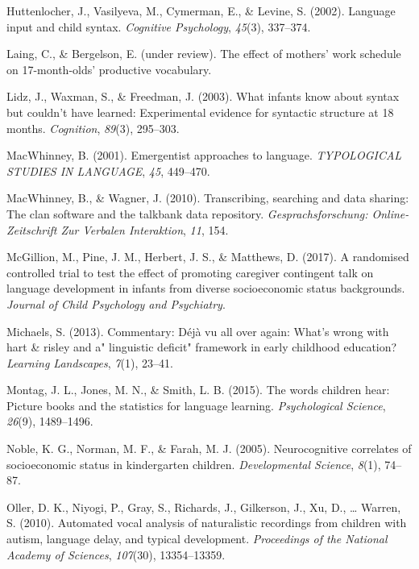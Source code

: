 \documentclass[floatsintext,man]{apa6}
\theoremstyle{definition}
\theoremstyle{definition}
\theoremstyle{definition}
\theoremstyle{remark}
\begin{document}
\leavevmode\hypertarget{ref-huttenlocher2002language}{}%
Huttenlocher, J., Vasilyeva, M., Cymerman, E., \& Levine, S. (2002).
Language input and child syntax. \emph{Cognitive Psychology},
\emph{45}(3), 337--374.

\leavevmode\hypertarget{ref-Laing_Bergelson_17}{}%
Laing, C., \& Bergelson, E. (under review). The effect of mothers' work
schedule on 17-month-olds' productive vocabulary.

\leavevmode\hypertarget{ref-lidz2003infants}{}%
Lidz, J., Waxman, S., \& Freedman, J. (2003). What infants know about
syntax but couldn't have learned: Experimental evidence for syntactic
structure at 18 months. \emph{Cognition}, \emph{89}(3), 295--303.

\leavevmode\hypertarget{ref-macwhinney2001emergentist}{}%
MacWhinney, B. (2001). Emergentist approaches to language.
\emph{TYPOLOGICAL STUDIES IN LANGUAGE}, \emph{45}, 449--470.

\leavevmode\hypertarget{ref-macwhinney2010transcribing}{}%
MacWhinney, B., \& Wagner, J. (2010). Transcribing, searching and data
sharing: The clan software and the talkbank data repository.
\emph{Gesprachsforschung: Online-Zeitschrift Zur Verbalen Interaktion},
\emph{11}, 154.

\leavevmode\hypertarget{ref-mcgillion2017randomised}{}%
McGillion, M., Pine, J. M., Herbert, J. S., \& Matthews, D. (2017). A
randomised controlled trial to test the effect of promoting caregiver
contingent talk on language development in infants from diverse
socioeconomic status backgrounds. \emph{Journal of Child Psychology and
Psychiatry}.

\leavevmode\hypertarget{ref-michaels2013commentary}{}%
Michaels, S. (2013). Commentary: Déjà vu all over again: What's wrong
with hart \& risley and a" linguistic deficit" framework in early
childhood education? \emph{Learning Landscapes}, \emph{7}(1), 23--41.

\leavevmode\hypertarget{ref-montag2015words}{}%
Montag, J. L., Jones, M. N., \& Smith, L. B. (2015). The words children
hear: Picture books and the statistics for language learning.
\emph{Psychological Science}, \emph{26}(9), 1489--1496.

\leavevmode\hypertarget{ref-noble2005neurocognitive}{}%
Noble, K. G., Norman, M. F., \& Farah, M. J. (2005). Neurocognitive
correlates of socioeconomic status in kindergarten children.
\emph{Developmental Science}, \emph{8}(1), 74--87.

\leavevmode\hypertarget{ref-oller2010automated}{}%
Oller, D. K., Niyogi, P., Gray, S., Richards, J., Gilkerson, J., Xu, D.,
\ldots{} Warren, S. (2010). Automated vocal analysis of naturalistic
recordings from children with autism, language delay, and typical
development. \emph{Proceedings of the National Academy of Sciences},
\emph{107}(30), 13354--13359.
\end{document}
